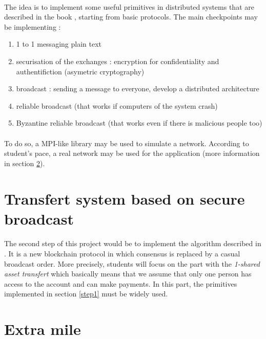 \documentclass{article}
\begin{document}
\paragraph{} 
The idea is to implement some useful primitives in distributed systems that are described in the book \cite{livre}, starting from basic protocols. The main checkpoints may be implementing :
\begin{enumerate}
    \item 1 to 1 messaging plain text
    \item securisation of the exchanges : encryption for confidentiality and authentifiction (asymetric cryptography)
    \item broadcast : sending a message to everyone, develop a distributed architecture
    \item reliable broadcast (that works if computers of the system crash)
    \item Byzantine reliable broadcast (that works even if there is malicious people too)
\end{enumerate}

\paragraph{} To do so, a MPI-like library may be used to simulate a network. According to student’s pace, a real network may be used for the application (more information in section \ref{step3}).

\section{Transfert system based on secure broadcast} \label{step2}
\paragraph{} The second step of this project would be to implement the algorithm described in \cite{crypto}. It is a new blockchain protocol in which consensus is replaced by a casual broadcast order. More precisely, students will focus on the part with the \emph{1-shared asset transfert} which basically means that we assume that only one person has access to the account and can make payments. In this part, the primitives implemented in section \ref{step1} must be widely used.

\section{Extra mile} \label{step3}
\end{document}
